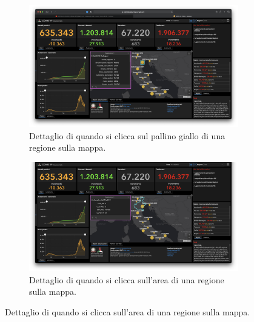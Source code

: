 \begin{enumerate}
        \begin{figure}[H]
            \centering
            \begin{subfigure}[b]{0.5\columnwidth}
                \includegraphics[width=\columnwidth]{../../../assets/images/verifica-risorse-esistenti/guidelines_violations_10}
                \caption{Dettaglio di quando si clicca sul pallino giallo di una regione sulla mappa.}
            \end{subfigure}
            
            \begin{subfigure}[b]{0.5\columnwidth}
                \includegraphics[width=\columnwidth]{../../../assets/images/verifica-risorse-esistenti/guidelines_violations_11}
                \caption{Dettaglio di quando si clicca sull'area di una regione sulla mappa.}
            \end{subfigure}


\end{figure}
\end{enumerate}
